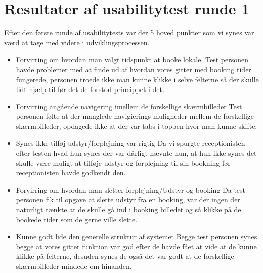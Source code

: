 \section{Resultater af usabilitytest runde 1 }
Efter den første runde af usabilitytests var der 5 hoved punkter som vi synes var værd at tage med videre i udviklingsprocessen.
\begin{itemize}
\item Forvirring om hvordan man valgt tidspunkt at booke lokale.
Test personen havde problemer med at finde ud af hvordan vores gitter med booking tider fungerede, personen troede ikke man kunne klikke i selve felterne så der skulle lidt hjælp til før det de forstod princippet i det.
\item Forvirring angående navigering imellem de forskellige skærmbilleder
Test personen følte at der manglede navigierings muligheder mellem de forskellige skærmbilleder, opdagede ikke at der var tabs i toppen hvor man kunne skifte.
\item Synes ikke tilføj udstyr/forplejning var rigtig
Da vi spurgte receptionisten efter testen hvad hun synes der var dårligt nævnte hun, at hun ikke synes det skulle være muligt at tilføje udstyr og forplejning til sin bookning før receptionisten havde godkendt den. 
\item Forvirring om hvordan man sletter forplejning/Udstyr og booking
Da test personen fik til opgave at slette udstyr fra en booking, var der ingen der naturligt tænkte at de skulle gå ind i booking billedet og så klikke på de bookede tider som de gerne ville slette.
\item Kunne godt lide den generelle struktur af systemet
Begge test personen synes begge at vores gitter funktion var god efter de havde fået at vide at de kunne klikke på felterne, desuden synes de også det var godt at de forskellige skærmbilleder mindede om hinanden.
\end{itemize}

